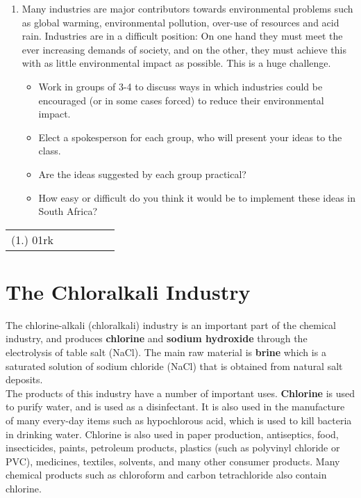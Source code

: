{\begin{enumerate}
\item{Many industries are major contributors towards environmental problems such as global warming, environmental pollution, over-use of resources and acid rain. Industries are in a difficult position: On one hand they must meet the ever increasing demands of society, and on the other, they must achieve this with as little environmental impact as possible. This is a huge challenge.

\begin{itemize}
\item{Work in groups of 3-4 to discuss ways in which industries could be encouraged (or in some cases forced) to reduce their environmental impact.}
\item{Elect a spokesperson for each group, who will present your ideas to the class.}
\item{Are the ideas suggested by each group practical?}
\item{How easy or difficult do you think it would be to implement these ideas in South Africa?}
\end{itemize}}
\end{enumerate}

\par \practiceinfo
\par \begin{tabular}[h]{cccccc}
(1.)	01rk	&
\end{tabular}
}


\section{The Chloralkali Industry}
\label{sec:chemical:chloralkali}

The chlorine-alkali (chloralkali) industry is an important part of the chemical industry, and produces \textbf{chlorine} and \textbf{sodium hydroxide} through the electrolysis of table salt (NaCl). The main raw material is \textbf{brine} which is a saturated solution of sodium chloride (NaCl) that is obtained from natural salt deposits. \\

The products of this industry have a number of important uses. \textbf{Chlorine} is used to purify water, and is used as a disinfectant. It is also used in the manufacture of many every-day items such as hypochlorous acid, which is used to kill bacteria in drinking water. Chlorine is also used in paper production, antiseptics, food, insecticides, paints, petroleum products, plastics (such as polyvinyl chloride or PVC), medicines, textiles, solvents, and many other consumer products. Many chemical products such as chloroform and carbon tetrachloride also contain chlorine.\\

